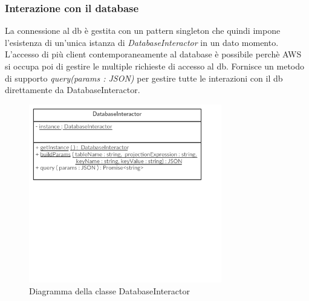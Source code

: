 \subsubsection{Interazione con il database}
La connessione al db è gestita con un pattern singleton che quindi impone l'esistenza di un'unica istanza di \textit{DatabaseInteractor} in un dato momento. L'accesso di più client contemporaneamente al database è possibile perchè AWS si occupa poi di gestire le multiple richieste di accesso al db.
Fornisce un metodo di supporto \textit{query(params : JSON)} per gestire tutte le interazioni con il db direttamente da DatabaseInteractor.


\begin{figure}[H]
	\begin{center}
		\includegraphics[width=0.75\textwidth, keepaspectratio]{../includes/pics/Singleton Pattern.png}
		\caption{Diagramma della classe DatabaseInteractor}
	\end{center}
\end{figure}

